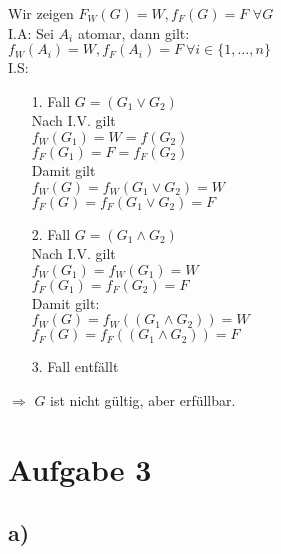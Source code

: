 \documentclass[a4paper]{scrartcl}
\begin{document}
\noindent
Wir zeigen $F_W (G) = W, f_F (G) = F$ $\forall G$\\
I.A: Sei $A_i$ atomar, dann gilt:\\
$f_W (A_i) = W, f_F (A_i) = F\ \forall i \in \{1, …, n\}$\\
I.S:
\begin{enumerate}
\item[1. Fall] $G = (G_1 \vee G_2 )$\\
Nach I.V. gilt\\
$f_W(G_1) = W = f(G_2)$\\
$f_F(G_1) = F = f_F(G_2)$\\
Damit gilt\\
$f_W(G) = f_W(G_1 \vee G_2) = W$\\
$f_F(G) = f_F ( G_1 \vee G_2 ) = F$

\item[2. Fall] $G = (G_1 \wedge G_2)$\\
Nach I.V. gilt\\
$f_W (G_1) = f_W (G_1) = W$\\
$f_F (G_1) = f_F (G_2) = F$\\
Damit gilt:\\
$f_W(G) = f_W ((G_1 \wedge G_2)) = W$\\
$f_F(G) = f_F (( G_1 \wedge G_2)) = F$

\item[3. Fall] entfällt
\end{enumerate}
$\Rightarrow$ $G$ ist nicht gültig, aber erfüllbar.

\newpage
\section*{Aufgabe 3}

\subsection*{a)}
\end{document}

